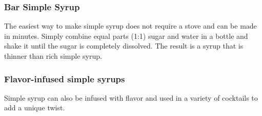 \subsubsection{Bar Simple Syrup}
The easiest way to make simple syrup does not require a stove and can be made in minutes. Simply combine equal parts (1:1) sugar and water in a bottle and shake it until the sugar is completely dissolved. The result is a syrup that is thinner than rich simple syrup.

\subsubsection{Flavor-infused simple syrups}
Simple syrup can also be infused with flavor and used in a variety of cocktails to add a unique twist.
